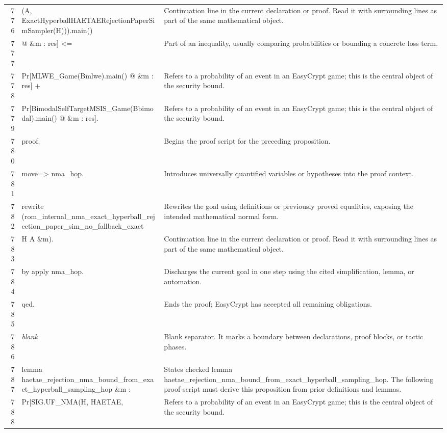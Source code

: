 \documentclass[10pt]{article}
\begin{document}
\begin{longtable}{r L{0.53\textwidth} L{0.37\textwidth}}
776 & {\ttfamily\scriptsize          (A, ExactHyperballHAETAERejectionPaperSimSampler(H))).main()} & Continuation line in the current declaration or proof.  Read it with surrounding lines as part of the same mathematical object. \\
777 & {\ttfamily\scriptsize        @ \&m : res] <=} & Part of an inequality, usually comparing probabilities or bounding a concrete loss term. \\
778 & {\ttfamily\scriptsize     Pr[MLWE\_Game(Bmlwe).main() @ \&m : res] +} & Refers to a probability of an event in an EasyCrypt game; this is the central object of the security bound. \\
779 & {\ttfamily\scriptsize     Pr[BimodalSelfTargetMSIS\_Game(Bbimodal).main() @ \&m : res].} & Refers to a probability of an event in an EasyCrypt game; this is the central object of the security bound. \\
780 & {\ttfamily\scriptsize proof.} & Begins the proof script for the preceding proposition. \\
781 & {\ttfamily\scriptsize move=> nma\_hop.} & Introduces universally quantified variables or hypotheses into the proof context. \\
782 & {\ttfamily\scriptsize rewrite (rom\_internal\_nma\_exact\_hyperball\_rejection\_paper\_sim\_no\_fallback\_exact} & Rewrites the goal using definitions or previously proved equalities, exposing the intended mathematical normal form. \\
783 & {\ttfamily\scriptsize            H A \&m).} & Continuation line in the current declaration or proof.  Read it with surrounding lines as part of the same mathematical object. \\
784 & {\ttfamily\scriptsize by apply nma\_hop.} & Discharges the current goal in one step using the cited simplification, lemma, or automation. \\
785 & {\ttfamily\scriptsize qed.} & Ends the proof; EasyCrypt has accepted all remaining obligations. \\
786 & {\ttfamily\scriptsize \emph{blank}} & Blank separator.  It marks a boundary between declarations, proof blocks, or tactic phases. \\
787 & {\ttfamily\scriptsize lemma haetae\_rejection\_nma\_bound\_from\_exact\_hyperball\_sampling\_hop \&m :} & States checked lemma haetae\_rejection\_nma\_bound\_from\_exact\_hyperball\_sampling\_hop.  The following proof script must derive this proposition from prior definitions and lemmas. \\
788 & {\ttfamily\scriptsize   Pr[SIG.UF\_NMA(H, HAETAE,} & Refers to a probability of an event in an EasyCrypt game; this is the central object of the security bound. \\

\end{longtable}
\end{document}
